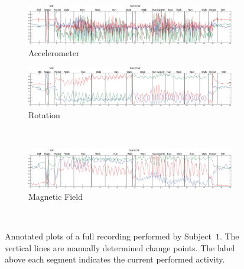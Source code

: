 \begin{figure}
  \centering
  \begin{subfigure}[b]{1\textwidth}
    \includegraphics[width=\textwidth]{./Figures/chapter6/data_collection/run-1-walk-run-roemer/data_plot_acc_annotated.eps}
    \caption{Accelerometer}
    \label{fig:recording_subject_1_run_1_accelerometer}
  \end{subfigure}

  \begin{subfigure}[b]{1\textwidth}
    \includegraphics[width=\textwidth]{./Figures/chapter6/data_collection/run-1-walk-run-roemer/data_plot_rot_annotated.eps}
    \caption{Rotation}
    \label{fig:recording_subject_1_run_1_rotation}
  \end{subfigure} \\

  \begin{subfigure}[b]{1\textwidth}
    \includegraphics[width=\textwidth]{./Figures/chapter6/data_collection/run-1-walk-run-roemer/data_plot_mag_annotated.eps}
    \caption{Magnetic Field}
    \label{fig:recording_subject_1_run_1_magnetic}
  \end{subfigure} \\
  \caption[Plots run 1]{Annotated plots of a full recording performed by Subject~$1$. The vertical lines are manually determined change points. The label above each segment indicates the current performed activity.}\label{fig:plots_subject_1}
\end{figure}

